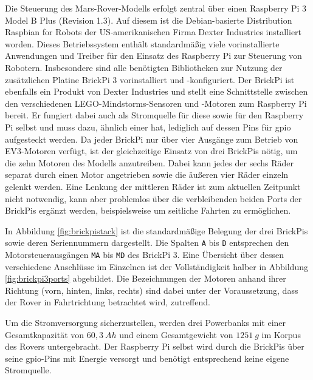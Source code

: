 Die Steuerung des Mars-Rover-Modells erfolgt zentral über einen Raspberry Pi 3 Model B Plus (Revision 1.3).
Auf diesem ist die Debian-basierte Distribution Raspbian for Robots der US-amerikanischen Firma Dexter Industries installiert worden.
Dieses Betriebssystem enthält standardmäßig viele vorinstallierte Anwendungen und Treiber für den Einsatz des Raspberry Pi zur Steuerung von Robotern.
Insbesondere sind alle benötigten Bibliotheken zur Nutzung der zusätzlichen Platine BrickPi 3 vorinstalliert und -konfiguriert.
Der BrickPi ist ebenfalls ein Produkt von Dexter Industries und stellt eine Schnittstelle zwischen den verschiedenen LEGO-Mindstorms-Sensoren und -Motoren zum Raspberry Pi bereit.
Er fungiert dabei auch als Stromquelle für diese sowie für den Raspberry Pi selbst und muss dazu, ähnlich einer \acf{hat}, lediglich auf dessen Pins für \acf{gpio} aufgesteckt werden.
Da jeder BrickPi nur über vier Ausgänge zum Betrieb von EV3-Motoren verfügt, ist der gleichzeitige Einsatz von drei BrickPis nötig, um die zehn Motoren des Modells anzutreiben.
Dabei kann jedes der sechs Räder separat durch einen Motor angetrieben sowie die äußeren vier Räder einzeln gelenkt werden.
Eine Lenkung der mittleren Räder ist zum aktuellen Zeitpunkt nicht notwendig, kann aber problemlos über die verbleibenden beiden Ports der BrickPis ergänzt werden, beispielsweise um seitliche Fahrten zu ermöglichen.

In Abbildung \ref{fig:brickpistack} ist die standardmäßige Belegung der drei BrickPis sowie deren Seriennummern dargestellt.
Die Spalten \texttt{A} bis \texttt{D} entsprechen den Motorsteuerausgängen \texttt{MA} bis \texttt{MD} des BrickPi 3.
Eine Übersicht über dessen verschiedene Anschlüsse im Einzelnen ist der Vollständigkeit halber in Abbildung \ref{fig:brickpi3ports} abgebildet.
Die Bezeichnungen der Motoren anhand ihrer Richtung (vorn, hinten, links, rechts) sind dabei unter der Voraussetzung, dass der Rover in Fahrtrichtung betrachtet wird, zutreffend.

Um die Stromversorgung sicherzustellen, werden drei Powerbanks mit einer Gesamtkapazität von $60{,}3\ Ah$ und einem Gesamtgewicht von $1251\ g$ im Korpus des Rovers untergebracht.
Der Raspberry Pi selbst wird durch die BrickPis über seine \acs{gpio}-Pins mit Energie versorgt \cite{cole2013} und benötigt entsprechend keine eigene Stromquelle.


